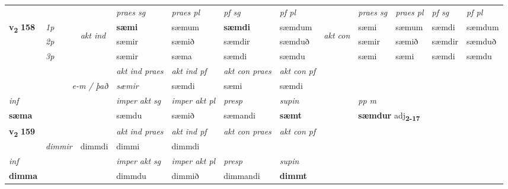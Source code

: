 \begin{longtable}[l]{X>{\footnotesize\itshape}llXXXXlXXXX}
 & &   & \textit{praes sg}  & \textit{praes pl}    & \textit{ pf sg} & \textit{pf pl} & & \textit{praes sg}  & \textit{praes pl}    & \textit{pf sg} & \textit{pf pl }  \\ \cmidrule{4-7} \cmidrule{9-12}
 \multirow{2}{*}{{{\textbf{v{\textsubscript{2}}} \Large{\textbf{158}}}}}  & 1p & \multirow{3}{*}{\begin{turn}{90}\textit{akt ind}\end{turn}} & \textbf{sæmi} & sæmum & \textbf{sæmdi} & sæmdum & \multirow{3}{*}{\begin{turn}{90}\textit{akt con}\end{turn}} &sæmi & sæmum & sæmdi & sæmdum\\*
 & 2p &  &  sæmir  & sæmið & sæmdir & sæmduð & & sæmir & sæmið & sæmdir & sæmduð \\*
 & 3p &  & sæmir & sæma & sæmdi & sæmdu & & sæmi & sæmi& sæmdi & sæmdu \\*
\cmidrule{4-7} \cmidrule{9-12}

   && &  \textit{akt ind praes} & \textit{akt ind pf} & \textit{akt con praes} & \textit{akt con pf} \\*
\multicolumn{3}{r}{\textit{e-m / það}} & sæmir & sæmdi & sæmi & sæmdi \\*

\cmidrule{4-7}
   {\textit{inf}} & &  & \textit{imper akt sg} & \textit{imper akt pl}   & \textit{presp} & \textit{supin}  && \textit{pp m} \\*
  {\textbf{sæma}} & && sæmdu  & sæmið   & sæmandi &  \textbf{sæmt}  && \multicolumn{2}{l}{\textbf{sæmdur} adj\textbf{\textsubscript{2-17}}} \\*

\midrule

\multirow{2}{*}{{{\textbf{v{\textsubscript{2}}} \Large{\textbf{159}}}}}  &&&  \textit{akt ind praes} & \textit{akt ind pf} & \textit{akt con praes} & \textit{akt con pf} \\*
\multicolumn{3}{r}{\textit{e-m / það}} & dimmir & dimmdi & dimmi & dimmdi \\*

\cmidrule{4-7}
   {\textit{inf}} & &  & \textit{imper akt sg} & \textit{imper akt pl}   & \textit{presp} & \textit{supin}   \\*
  {\textbf{dimma}} & && dimmdu  & dimmið   & dimmandi &  \textbf{dimmt}   \\*

\midrule


\end{longtable}
